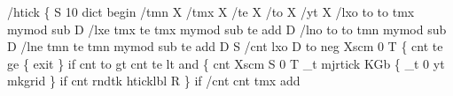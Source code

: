 \documentclass[11pt]{article}
\begin{document}
/htick \{                 %
  S                      %
    10 dict begin        %
      /tmn X             %
      /tmx X             %
      /te X              %
      /to X              %
      /yt X              %
      /lxo               %
        to               %
        to tmx mymod     %
        sub              %
      D                  %
      /lxe               %
        tmx              %
        te tmx mymod     %
        sub              %
        te add           %
      D                  %
      /lno               %
        to               %
        to tmn mymod     %
        sub              %
      D                  %
      /lne               %
        tmn              %
        te tmn mymod     %
        sub              %
        te add           %
      D                  %
      S                  %
        /cnt             %
          lxo            %
        D                %
        to neg Xscm 0 T  %
        \{                %
          cnt te ge \{    %
            exit         %
          \} if           %
          cnt to gt      %
          cnt te lt      %
          and \{          %
            cnt Xscm     %
            S            %
              0 T               %
              _t mjrtick        %
              KGb \{             %
                _t 0 yt mkgrid  %
              \} if              %
              cnt rndtk  %
              hticklbl   %
            R            %
          \} if           %
          /cnt           %
            cnt tmx add  %
\end{document}
